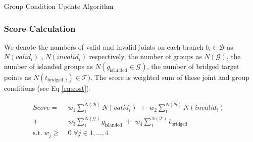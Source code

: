 \begin{algorithm}
  \caption{Group Condition Update Algorithm}
  \begin{algorithmic}[1]
    \EndIf

            \EndIf
            \EndIf
          \EndIf
        \EndFor
      \EndFor

      \EndIf
    \EndFor

  \EndFunction
  \end{algorithmic}
  \label{al:connection}
\end{algorithm}

\subsubsection*{Score Calculation}
We denote the numbers of valid and invalid joints on each branch $b_i \in \mathcal{B}$ as $N(valid_i)$ , $N(invalid_i)$ respectively, the number of groups as $N(\mathcal{G} )$, the number of islanded groups as $N(g_{\text{islanded}} \in \mathcal{G} )$, the number of bridged target points as $N(t_{\text{bridged}, i}) \in \mathcal{T} )$.
The score is weighted sum of these joint and group conditions (see Eq \ref{eq:cost}).

\begin{equation} \label{eq:cost}
 \begin{aligned}
 Score =  &\; w_1  \sum_{1}^{N(\mathcal{B})}N(valid_i) \; +
\; w_2  \sum_{1}^{N(\mathcal{B})} N(invalid_i) \\
+ &\; w_3  \sum_{1}^{N(\mathcal{G})} g_{\text{islanded}} \;+
\; w_4  \sum_{1}^{N(\mathcal{T})} t_{\text{bridged}}
 \\
   \textrm{s.t.} \; w_j  \geq  &\;0 \; \forall j \in 1, \dotsc , 4
 \end{aligned}
\end{equation}

